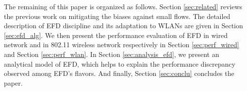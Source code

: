 \documentclass[preprint,12pt]{elsarticle}
\begin{document}

The remaining of this paper is organized as follows. Section \ref{sec:related} reviews the previous work on mitigating the biases against small flows. The detailed description of EFD discipline and its adaptation to WLANs are given in Section \ref{sec:efd_alg}. We then present the performance evaluation of EFD in wired network and in 802.11 wireless network respectively in Section \ref{sec:perf_wired} and Section \ref{sec:perf_wlan}. In Section \ref{sec:analysis_efd}, we present an analytical model of EFD, which helps to explain the performance discrepancy observed among EFD's flavors. And finally, Section \ref{sec:conclu} concludes the paper.


\end{document}
